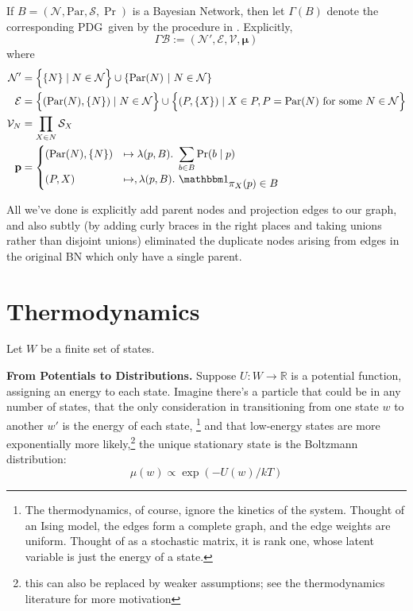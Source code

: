 \documentclass{article}
\newcommand{\bmu}{\boldsymbol{\mu}}
\newcommand{\Ed}{\mathcal E}
\newcommand{\MN}{PDG}
\numberwithin{equation}{section}
\begin{document}
\begin{notfocus}
	
	\begin{defn} \label{def:bnconvert-formal}
		If $B = (\mathcal N, \mathrm{Par}, \mathcal S, \Pr)$ is a Bayesian Network, then let $\Gamma (B)$ denote the corresponding \MN\ given by the procedure in . Explicitly, 
		\[ \Gamma\mathcal B :=  (\mathcal N', \Ed, \mathcal V, \bmu) \]
		where %
		\begin{align*}
		\mathcal N' &=  \left\{ \Big.\{N\} \mid N \in \mathcal N\right\} \cup \left\{ \mathrm{Par}(N) ~\middle|~ N \in \cal N \right\} \\%
		\Ed &= \left\{ \vphantom{\Big|}(\mathrm{Par}(N), \{N\}) \mid N \in \mathcal N \right\} \cup 
		\left\{\vphantom{\Big|} (P, \{X\}) \mid X \in P, P = \mathrm{Par}(N) \text{ for some }N \in \mathcal N \right\} \\
		\mathcal V_N &= \prod_{X \in N} \mathcal S_X \\
		\mathbf p &= \begin{cases}
		(\mathrm{Par}(N), \{N\}) &\mapsto \lambda(p, B).~ \displaystyle\sum_{b \in  B} \Pr(b \mid p) \\
		(P, X) &\mapsto, \lambda (p, B).~ \displaystyle \mathbbm 1_{\displaystyle\pi_X(p) \in B}
		\end{cases}
		\end{align*}
	\end{defn}
	All we've done is explicitly add parent nodes and projection edges to our graph, and also subtly (by adding curly braces in the right places and taking unions rather than disjoint unions) eliminated the duplicate nodes arising from edges in the original BN which only have a single parent.
	
	\section{Thermodynamics}\label{sec:thermo-background}
	Let $W$ be a finite set of states.
	
	\textbf{From Potentials to Distributions.}
	Suppose $U: W \to \mathbb R$ is a potential function, assigning an energy to each state. Imagine there's a particle that could be in any number of states, that the only consideration in transitioning from one state $w$ to another $w'$ is the energy of each state,%
		\footnote{The thermodynamics, of course, ignore the kinetics of the system. Thought of an Ising model, the edges form a complete graph, and the edge weights are uniform. Thought of as a stochastic matrix, it is rank one, whose latent variable is just the energy of a state.}
	and that low-energy states are more exponentially more likely,\footnote{this can also be replaced by weaker assumptions; see the thermodynamics literature for more motivation}
	the unique stationary state is the Boltzmann distribution:
	\begin{equation}
		 \mu(w) \propto \exp( - U(w) / kT ) \label{eq:boltzmann-appendix}
	\end{equation}


\end{notfocus}
\end{document}
